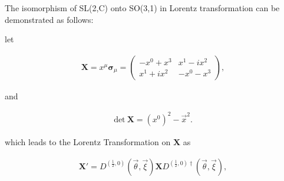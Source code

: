 \documentclass[12pt]{beamer}
\begin{document}
\begin{frame}
The isomorphism of SL(2,C) onto SO(3,1) in Lorentz transformation can be demonstrated as follows:

let

\begin{align}
\bm{X}=x^\mu\bm{\sigma}_\mu=\begin{pmatrix}-x^0+x^3&x^1-ix^2\\x^1+ix^2&-x^0-x^3\end{pmatrix},
\end{align}

\noindent  and

\begin{align}
\mbox{det}~\bm{X}=(x^0)^2-\vec{x}^2.
\end{align}

\noindent which leads to the Lorentz Transformation on $ \bm{X} $ as

\begin{align}
\bm{X}'=D^{(\frac{1}{2},0)}(\vec{\theta},\vec{\xi})\bm{X}D^{(\frac{1}{2},0)\dag}(\vec{\theta},\vec{\xi}),
\end{align}

\end{frame}
\end{document}

